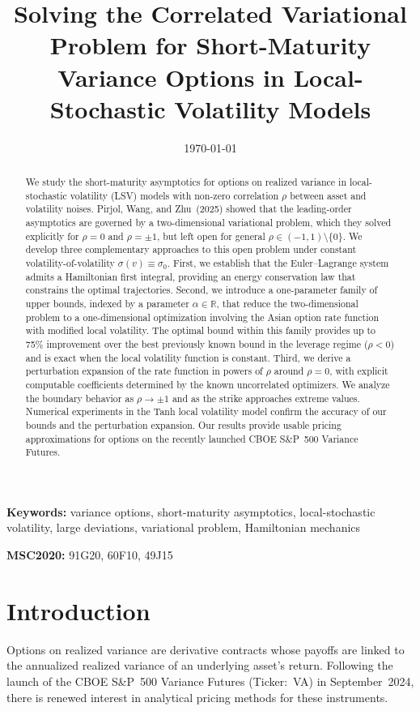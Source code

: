 \documentclass[12pt]{article}
\title{Solving the Correlated Variational Problem for Short-Maturity Variance Options in Local-Stochastic Volatility Models}
\author{}
\date{\today}
\newcommand{\R}{\mathbb{R}}
\begin{document}
\maketitle

\begin{abstract}
We study the short-maturity asymptotics for options on realized variance in local-stochastic
volatility (LSV) models with non-zero correlation $\rho$ between asset and volatility noises.
Pirjol, Wang, and Zhu~(2025) showed that the leading-order asymptotics are governed by
a two-dimensional variational problem, which they solved explicitly for $\rho=0$ and
$\rho=\pm 1$, but left open for general $\rho\in(-1,1)\setminus\{0\}$. We develop three
complementary approaches to this open problem under constant volatility-of-volatility
$\sigma(v)\equiv\sigma_0$. First, we establish that the Euler--Lagrange system admits a
Hamiltonian first integral, providing an energy conservation law that constrains the
optimal trajectories. Second, we introduce a one-parameter family of upper bounds,
indexed by a parameter $\alpha\in\R$, that reduce the two-dimensional problem to a
one-dimensional optimization involving the Asian option rate function with modified local
volatility. The optimal bound within this family provides up to 75\% improvement over
the best previously known bound in the leverage regime ($\rho<0$) and is
exact when the local volatility function is constant. Third, we derive
a perturbation expansion of the rate function in powers of $\rho$ around $\rho=0$, with
explicit computable coefficients determined by the known uncorrelated optimizers. We
analyze the boundary behavior as $\rho\to\pm 1$ and as the strike approaches extreme values.
Numerical experiments in the Tanh local volatility model confirm the accuracy of our
bounds and the perturbation expansion. Our results provide usable pricing approximations
for options on the recently launched CBOE S\&P~500 Variance Futures.
\end{abstract}

\noindent\textbf{Keywords:} variance options, short-maturity asymptotics, local-stochastic
volatility, large deviations, variational problem, Hamiltonian mechanics

\noindent\textbf{MSC2020:} 91G20, 60F10, 49J15

\section{Introduction}

Options on realized variance are derivative contracts whose payoffs are linked to the
annualized realized variance of an underlying asset's return. Following the launch of the
CBOE S\&P~500 Variance Futures (Ticker:~VA) in September~2024, there is renewed
interest in analytical pricing methods for these instruments.
\end{document}
